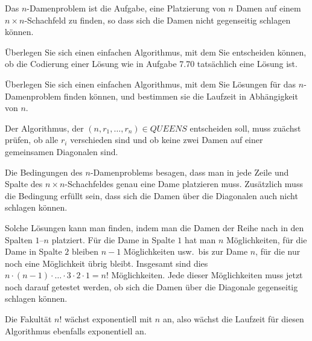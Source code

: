 Das $n$-Damenproblem ist die Aufgabe, eine Platzierung von $n$ Damen auf
einem $n\times n$-Schachfeld zu finden, so dass sich die Damen nicht
gegenseitig schlagen können.
\begin{teilaufgaben}
\item
Überlegen Sie sich einen einfachen Algorithmus, mit dem Sie entscheiden
können, ob die Codierung einer Lösung wie in Aufgabe 7.70 tatsächlich
eine Lösung ist.
\item
Überlegen Sie sich einen einfachen Algorithmus, mit dem Sie Lösungen
für das $n$-Damen\-problem finden können, und bestimmen sie die
Laufzeit in Abhängigkeit von $n$.
\end{teilaufgaben}

\begin{loesung}
\begin{teilaufgaben}
\item
Der Algorithmus, der $(n,r_1,\dots,r_n)\in\textit{QUEENS}$ entscheiden
soll, muss zuächst prüfen, ob alle $r_i$ verschieden sind und
ob keine zwei Damen auf einer gemeinsamen Diagonalen sind.
\item
Die Bedingungen des $n$-Damenproblems besagen, dass man in jede Zeile
und Spalte des $n\times n$-Schachfeldes genau eine Dame platzieren muss.
Zusätzlich muss die Bedingung erfüllt sein, dass sich die Damen über die
Diagonalen auch nicht schlagen können.

Solche Lösungen kann man finden, indem man die Damen 
der Reihe nach in den Spalten $1$--$n$ platziert.
Für die Dame in Spalte $1$ hat man $n$ Möglichkeiten, für die Dame
in Spalte $2$ bleiben $n-1$ Möglichkeiten usw.~bis zur Dame $n$, für
die nur noch eine Möglichkeit übrig bleibt.
Insgesamt sind dies $n\cdot (n-1)\cdot\ldots\cdot 3\cdot 2\cdot 1=n!$
Möglichkeiten.
Jede dieser Möglichkeiten muss jetzt noch darauf getestet werden,
ob sich die Damen über die Diagonale gegenseitig schlagen können.

Die Fakultät $n!$ wächst exponentiell mit $n$ an, also wächst die
Laufzeit für diesen Algorithmus ebenfalls exponentiell an.
\qedhere
\end{teilaufgaben}
\end{loesung}
